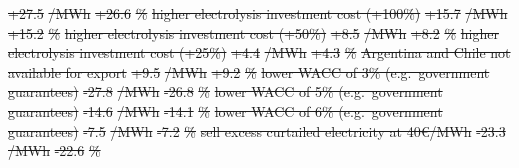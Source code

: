 \documentclass[5p,9pt,draft]{elsarticle}
\providecommand{\DIFdeltex}[1]{{\protect\color{red}\sout{#1}}}                      %
\providecommand{\DIFdelFL}[1]{\DIFdel{#1}} %
\providecommand{\DIFdel}[1]{\texorpdfstring{\DIFdeltex{#1}}{}} %
\begin{document}
\DIFdelFL{+27.5 }%
\DIFdelFL{/MWh  }%
\DIFdelFL{+26.6 }%
\DIFdelFL{\% }%
\DIFdelFL{higher electrolysis investment cost (+100\%) }%
\DIFdelFL{+15.7 }%
\DIFdelFL{/MWh  }%
\DIFdelFL{+15.2 }%
\DIFdelFL{\% }%
\DIFdelFL{higher electrolysis investment cost (+50\%) }%
\DIFdelFL{+8.5 }%
\DIFdelFL{/MWh  }%
\DIFdelFL{+8.2 }%
\DIFdelFL{\% }%
\DIFdelFL{higher electrolysis investment cost (+25\%) }%
\DIFdelFL{+4.4 }%
\DIFdelFL{/MWh  }%
\DIFdelFL{+4.3 }%
\DIFdelFL{\% }%
\DIFdelFL{Argentina and Chile not available for export }%
\DIFdelFL{+9.5 }%
\DIFdelFL{/MWh  }%
\DIFdelFL{+9.2 }%
\DIFdelFL{\% }%
\DIFdelFL{lower WACC of 3\% (e.g.~government guarantees) }%
\DIFdelFL{-27.8 }%
\DIFdelFL{/MWh  }%
\DIFdelFL{-26.8 }%
\DIFdelFL{\% }%
\DIFdelFL{lower WACC of 5\% (e.g.~government guarantees) }%
\DIFdelFL{-14.6 }%
\DIFdelFL{/MWh  }%
\DIFdelFL{-14.1 }%
\DIFdelFL{\% }%
\DIFdelFL{lower WACC of 6\% (e.g.~government guarantees) }%
\DIFdelFL{-7.5 }%
\DIFdelFL{/MWh  }%
\DIFdelFL{-7.2 }%
\DIFdelFL{\% }%
\DIFdelFL{sell excess curtailed electricity at 40€/MWh }%
\DIFdelFL{-23.3 }%
\DIFdelFL{/MWh  }%
\DIFdelFL{-22.6 }%
\DIFdelFL{\% }%
\end{document}
